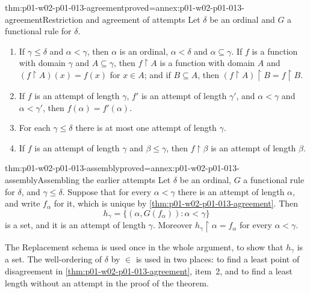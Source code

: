 \begin{hblemma}{thm:p01-w02-p01-013-agreement}{proved=annex:p01-w02-p01-013-agreement}{Restriction and agreement of attempts}
Let \(\delta\) be an ordinal and \(G\) a functional rule for \(\delta\).
\begin{enumerate}
  \item If \(\gamma\leq\delta\) and \(\alpha<\gamma\), then \(\alpha\) is an
        ordinal, \(\alpha<\delta\) and \(\alpha\subseteq\gamma\). If \(f\) is
        a function with domain \(\gamma\) and \(A\subseteq\gamma\), then
        \(f\mathbin{\upharpoonright}A\) is a function with domain \(A\) and
        \((f\mathbin{\upharpoonright}A)(x)=f(x)\) for \(x\in A\); and if
        \(B\subseteq A\), then
        \((f\mathbin{\upharpoonright}A)\mathbin{\upharpoonright}B
        =f\mathbin{\upharpoonright}B\).
  \item If \(f\) is an attempt of length \(\gamma\), \(f'\) is an attempt of
        length \(\gamma'\), and \(\alpha<\gamma\) and \(\alpha<\gamma'\), then
        \(f(\alpha)=f'(\alpha)\).
  \item For each \(\gamma\leq\delta\) there is at most one attempt of length
        \(\gamma\).
  \item If \(f\) is an attempt of length \(\gamma\) and \(\beta\leq\gamma\),
        then \(f\mathbin{\upharpoonright}\beta\) is an attempt of length
        \(\beta\).
\end{enumerate}
\end{hblemma}

\begin{hblemma}{thm:p01-w02-p01-013-assembly}{proved=annex:p01-w02-p01-013-assembly}{Assembling the earlier attempts}
Let \(\delta\) be an ordinal, \(G\) a functional rule for \(\delta\), and
\(\gamma\leq\delta\). Suppose that for every \(\alpha<\gamma\) there is an
attempt of length \(\alpha\), and write \(f_\alpha\) for it, which is unique
by \cref{thm:p01-w02-p01-013-agreement}. Then
\[
  h_\gamma=\{(\alpha,G(f_\alpha)):\alpha<\gamma\}
\]
is a set, and it is an attempt of length \(\gamma\). Moreover
\(h_\gamma\mathbin{\upharpoonright}\alpha=f_\alpha\) for every
\(\alpha<\gamma\).
\end{hblemma}

The Replacement schema is used once in the whole argument, to show that
\(h_\gamma\) is a set. The well-ordering of \(\delta\) by \(\in\) is used in
two places: to find a least point of disagreement in
\cref{thm:p01-w02-p01-013-agreement}, item~2, and to find a least length
without an attempt in the proof of the theorem.

